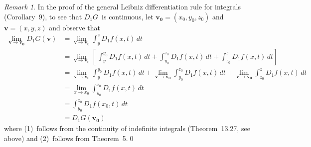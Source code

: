 \documentclass[letterpaper,12pt]{article}
\renewcommand{\d}[1]{\,d\!{#1}}
\newcommand{\dt}{\d{t}}
\renewcommand{\vec}[1]{\boldsymbol{#1}}
\theoremstyle{plain}
\theoremstyle{definition}
\theoremstyle{remark}
\newtheorem*{rmk}{Remark}
\begin{document}
\begin{rmk}
In the proof of the general Leibniz differentiation rule for integrals (Corollary~9), to see that \(D_1G\)~is continuous, let \(\vec{v_0}=(x_0,y_0,z_0)\) and \(\vec{v}=(x,y,z)\) and observe that
\begin{align*}
\lim_{\vec{v}\to\vec{v_0}}D_1G(\vec{v})&=\lim_{\vec{v}\to\vec{v_0}}\int_y^z D_1f(x,t)\dt\\
	&=\lim_{\vec{v}\to\vec{v_0}}\left[\,\int_y^{y_0}D_1f(x,t)\dt+\int_{y_0}^{z_0}D_1f(x,t)\dt+\int_{z_0}^z D_1f(x,t)\dt\right]\\
	&=\lim_{\vec{v}\to\vec{v_0}}\int_y^{y_0}\!\!\!D_1f(x,t)\dt+\lim_{\vec{v}\to\vec{v_0}}\int_{y_0}^{z_0}\!\!\!D_1f(x,t)\dt+\lim_{\vec{v}\to\vec{v_0}}\int_{z_0}^z\!D_1f(x,t)\dt\\
	&=\lim_{x\to x_0}\int_{y_0}^{z_0}D_1f(x,t)\dt\tag{1}\\
	&=\int_{y_0}^{z_0}D_1f(x_0,t)\dt\tag{2}\\
	&=D_1G(\vec{v_0})
\end{align*}
where (1)~follows from the continuity of indefinite integrals (Theorem~13.27, see above) and (2)~follows from Theorem~5.\qed
\end{rmk}
\end{document}
